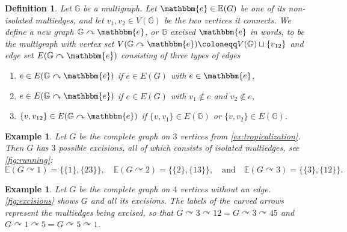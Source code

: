 \documentclass[11pt,reqno,a4paper]{amsart}
\theoremstyle{theoremstyle}
\theoremstyle{examplestyle}
\newtheorem{example}[theorem]{Example}
\newtheorem{definition}[theorem]{Definition}
\theoremstyle{algorithmstyle}
\newcommand{\EE}{\mathbb{E}}
\newcommand{\ee}{\mathbbm{e}}
\newcommand{\GG}{\mathbb{G}}
\begin{document}
\begin{definition}
  \label{def:excision}
  Let $\GG$ be a multigraph.  Let $\ee\in \EE(G)$ be one of its non-isolated multiedges, and let $v_1,v_2\in V(\GG)$ be the two vertices it connects.  We define a new graph $\GG\curvearrowright \ee$, or \emph{$\GG$ excised $\ee$} in words, to be the multigraph with vertex set $V(\GG\curvearrowright \ee) \coloneqq V(\GG)\sqcup\{v_{12}\}$ and edge set $E(\GG\curvearrowright \ee)$ consisting of three types of edges
  \begin{enumerate}
  \item $e\in E(\GG\curvearrowright \ee)$ if $e\in E(G)$ with $e\in \ee$,
  \item $e\in E(\GG\curvearrowright \ee)$ if $e\in E(G)$ with $v_1\notin e$ and $v_2\notin e$,
  \item $\{v,v_{12}\}\in E(\GG\curvearrowright \ee)$ if $\{v,v_1\}\in E(\GG)$ or $\{v,v_2\}\in E(\GG)$.
  \end{enumerate}
\end{definition}

\begin{example}
  Let $G$ be the complete graph on $3$ vertices from \cref{ex:tropicalization}.  Then $G$ has $3$ possible excisions, all of which consists of isolated multiedges, see \cref{fig:running}:
  \begin{equation*}
    \EE( G\curvearrowright 1 ) = \big\{ \{1\}, \{23\} \big\},\quad
    \EE( G\curvearrowright 2 ) = \big\{ \{2\}, \{13\} \big\},\quad\text{and}\quad
    \EE( G\curvearrowright 3 ) = \big\{ \{3\}, \{12\} \big\}.
  \end{equation*}
\end{example}

\begin{example}
  \label{ex:excision}
  Let $G$ be the complete graph on $4$ vertices without an edge.  \cref{fig:excisions} shows $G$ and all its excisions. The labels of the curved arrows represent the multiedges being excised, so that $G\curvearrowright 3\curvearrowright 12 = G\curvearrowright 3\curvearrowright 45$ and $G\curvearrowright 1\curvearrowright 5 = G\curvearrowright 5\curvearrowright 1$.
\end{example}
\end{document}
